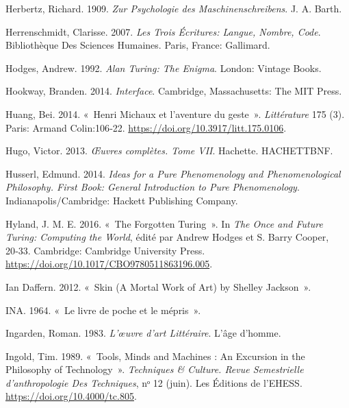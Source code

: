 \begin{CSLReferences}{1}{0}
\leavevmode{}%
Herbertz, Richard. 1909. \emph{{Zur Psychologie des
Maschinenschreibens}}. {J. A. Barth}.

\leavevmode{}%
Herrenschmidt, Clarisse. 2007. \emph{Les Trois {É}critures: {Langue},
Nombre, Code}. Biblioth{è}que Des Sciences Humaines. {Paris, France}:
{Gallimard}.

\leavevmode{}%
Hodges, Andrew. 1992. \emph{Alan {Turing}: {The Enigma}}. {London}:
{Vintage Books}.

\leavevmode{}%
Hookway, Branden. 2014. \emph{Interface}. {Cambridge, Massachusetts}:
{The MIT Press}.

\leavevmode{}%
Huang, Bei. 2014. {«~{Henri Michaux et l'aventure du geste}~»}.
\emph{Litt{é}rature} 175 (3). {Paris}: {Armand Colin}:106‑22.
\url{https://doi.org/10.3917/litt.175.0106}.

\leavevmode{}%
Hugo, Victor. 2013. \emph{{{Œ}uvres compl{è}tes. Tome VII}}. Hachette.
{HACHETTBNF}.

\leavevmode{}%
Husserl, Edmund. 2014. \emph{Ideas for a {Pure Phenomenology} and
{Phenomenological Philosophy}. {First} Book: {General Introduction} to
{Pure Phenomenology}}. {Indianapolis/Cambridge}: {Hackett Publishing
Company}.

\leavevmode{}%
Hyland, J. M. E. 2016. {«~The {Forgotten Turing}~»}. In \emph{The {Once}
and {Future Turing}: {Computing} the {World}}, édité par Andrew Hodges
et S. Barry Cooper, 20‑33. {Cambridge}: {Cambridge University Press}.
\url{https://doi.org/10.1017/CBO9780511863196.005}.

\leavevmode{}%
Ian Daffern. 2012. {«~Skin ({A Mortal Work} of {Art}) by {Shelley
Jackson}~»}.

\leavevmode{}%
INA. 1964. {«~{Le livre de poche et le m{é}pris}~»}.

\leavevmode{}%
Ingarden, Roman. 1983. \emph{L'{œ}uvre d'art Litt{é}raire}. {L'{â}ge
d'homme}.

\leavevmode{}%
Ingold, Tim. 1989. {«~Tools, {Minds} and {Machines} : An {Excursion} in
the {Philosophy} of {Technology}~»}. \emph{Techniques \& Culture. Revue
Semestrielle d'anthropologie Des Techniques}, nᵒ 12 (juin). {Les
{É}ditions de l'EHESS}. \url{https://doi.org/10.4000/tc.805}.


\end{CSLReferences}
